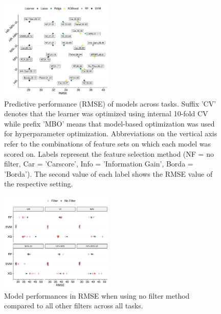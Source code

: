 \documentclass[letterpaper, peerreview, draftcls]{IEEEtran}
\begin{document}
\begin{figure} [t!]
	\centering
	\begin{center}
		\includegraphics[width=0.48\textwidth] {performance-results-1.pdf}
		\caption{Predictive performance (RMSE) of models across tasks. Suffix 'CV' denotes that the learner was optimized using internal 10-fold CV while prefix 'MBO' means that model-based optimization was used for hyperparameter optimization. Abbreviations on the vertical axis refer to the combinations of feature sets on which each model was scored on. Labels represent the feature selection method (NF = no filter, Car = 'Carscore', Info = 'Information Gain', Borda = 'Borda'). The second value of each label shows the RMSE value of the respective setting.}\label{fig:perf-result}
	\end{center}
\end{figure}

\begin{figure} [t!]
	\centering
	\begin{center}
		\includegraphics[width=0.48\textwidth] {filter-effect-all-vs-no-filter-1.pdf}
		\caption{Model performances in RMSE when using no filter method compared to all other filters across all tasks.}\label{fig:filter-effects-no-filter}
	\end{center}
\end{figure}
\end{document}

